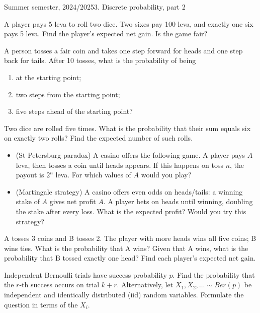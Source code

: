 \documentclass[a4paper]{report}
\begin{document}
\pagebreak
\noindent Summer semester, 2024/2025\hfill 3. Discrete probability, part 2
\par\noindent\hrulefill\par
\begin{problembook}
A player pays 5 leva to roll two dice. Two sixes pay 100 leva, and exactly one six pays 5 leva. Find the player's expected net gain. Is the game fair?
\end{problembook}
\begin{problembook}
A person tosses a fair coin and takes one step forward for heads and one step back for tails. After 10 tosses, what is the probability of being
\begin{enumerate}\item at the starting point;\item two steps from the starting point;\item five steps ahead of the starting point?\end{enumerate}
\end{problembook}
\begin{problembook}
Two dice are rolled five times. What is the probability that their sum equals six on exactly two rolls? Find the expected number of such rolls.
\end{problembook}
\begin{probleminteresting}
\begin{itemize}
\item (St Petersburg paradox) A casino offers the following game. A player pays $A$ leva, then tosses a coin until heads appears. If this happens on toss $n$, the payout is $2^n$ leva. For which values of $A$ would you play?
\item (Martingale strategy) A casino offers even odds on heads/tails: a winning stake of $A$ gives net profit $A$. A player bets on heads until winning, doubling the stake after every loss. What is the expected profit? Would you try this strategy?
\end{itemize}
\end{probleminteresting}
\begin{problembook}
A tosses 3 coins and B tosses 2. The player with more heads wins all five coins; B wins ties. What is the probability that A wins? Given that A wins, what is the probability that B tossed exactly one head? Find each player's expected net gain.
\end{problembook}
\begin{problem}
Independent Bernoulli trials have success probability $p$. Find the probability that the $r$-th success occurs on trial $k+r$. Alternatively, let $X_1,X_2,\dots\sim Ber(p)$ be independent and identically distributed (iid) random variables. Formulate the question in terms of the $X_i$.
\end{problem}
\end{document}

